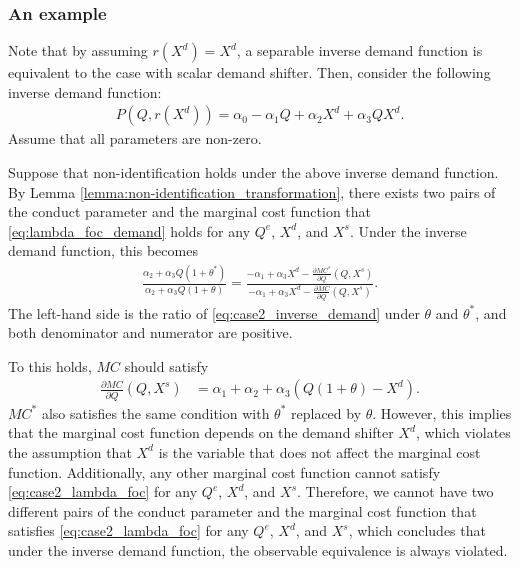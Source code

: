 \documentclass[11pt, a4paper]{article}
\theoremstyle{remark}
\begin{document}
\subsubsection{An example}

Note that by assuming $r(X^{d}) = X^{d}$, a separable inverse demand function is equivalent to the case with scalar demand shifter.
Then, consider the following inverse demand function:
\begin{align}
    P(Q, r(X^{d})) = \alpha_0 - \alpha_1 Q + \alpha_2 X^{d} + \alpha_3 QX^{d}.\label{eq:case2_inverse_demand}
\end{align}
Assume that all parameters are non-zero.

Suppose that non-identification holds under the above inverse demand function.
By Lemma \ref{lemma:non-identification_transformation}, there exists two pairs of the conduct parameter and the marginal cost function that \eqref{eq:lambda_foc_demand} holds for any $Q^e$, $X^{d}$, and $X^{s}$.
Under the inverse demand function, this becomes
\begin{align}
    \frac{\alpha_2 + \alpha_3 Q (1 + \theta^{*})}{\alpha_2 + \alpha_3 Q (1 + \theta)} = \frac{-\alpha_1 + \alpha_3 X^{d} - \frac{\partial MC^{*}}{\partial Q}(Q, X^{s})}{-\alpha_1 + \alpha_3 X^{d} - \frac{\partial MC}{\partial Q}(Q, X^{s})}.\label{eq:case2_lambda_foc}
\end{align}
The left-hand side is the ratio of \eqref{eq:case2_inverse_demand} under $\theta$ and $\theta^{*}$, and both denominator and numerator are positive.

To this holds, $MC$ should satisfy
\begin{align}
    \frac{\partial MC}{\partial Q}(Q, X^{s}) & = \alpha_1 + \alpha_2 + \alpha_3 (Q(1 + \theta) - X^{d}). 
\end{align}
$MC^{*}$ also satisfies the same condition with $\theta^{*}$ replaced by $\theta$.
However, this implies that the marginal cost function depends on the demand shifter $X^{d}$, which violates the assumption that $X^{d}$ is the variable that does not affect the marginal cost function.
Additionally, any other marginal cost function cannot satisfy \eqref{eq:case2_lambda_foc} for any $Q^e$, $X^{d}$, and $X^{s}$.
Therefore, we cannot have two different pairs of the conduct parameter and the marginal cost function that satisfies \eqref{eq:case2_lambda_foc} for any $Q^e$, $X^{d}$, and $X^{s}$, which concludes that under the inverse demand function, the observable equivalence is always violated.
\end{document}
